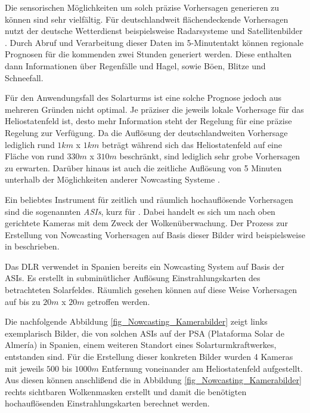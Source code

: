 Die sensorischen Möglichkeiten um solch präzise Vorhersagen generieren zu können sind sehr vielfältig.
Für deutschlandweit flächendeckende Vorhersagen nutzt der deutsche Wetterdienst beispielsweise Radarsysteme und Satellitenbilder \cite{DWD1}.
Durch Abruf und Verarbeitung dieser Daten im 5-Minutentakt können regionale Prognosen für die kommenden zwei Stunden generiert werden.
Diese enthalten dann Informationen über Regenfälle und Hagel, sowie Böen, Blitze und Schneefall.

Für den Anwendungsfall des Solarturms ist eine solche Prognose jedoch aus mehreren Gründen nicht optimal.
Je präziser die jeweils lokale Vorhersage für das Heliostatenfeld ist, desto mehr Information steht der Regelung für eine präzise Regelung zur Verfügung.
Da die Auflösung der deutschlandweiten Vorhersage lediglich rund $1km$ x $1km$ beträgt \cite{DWD1}\cite{DWD2} während sich das Heliostatenfeld auf eine Fläche von rund $330m$ x $310m$ beschränkt, sind lediglich sehr grobe Vorhersagen zu erwarten.
Darüber hinaus ist auch die zeitliche Auflösung von 5 Minuten \cite{DWD2} unterhalb der Möglichkeiten anderer Nowcasting Systeme \cite{DLRNowcasting}\cite[S. 272]{QuesadaRuiz}.

Ein beliebtes Instrument für zeitlich und räumlich hochauflösende Vorhersagen sind die sogenannten \textit{ASIs}, kurz für .
Dabei handelt es sich um nach oben gerichtete Kameras mit dem Zweck der Wolkenüberwachung.
Der Prozess zur Erstellung von Nowcasting Vorhersagen auf Basis dieser Bilder wird beispielsweise in \cite{QuesadaRuiz} beschrieben. \cite{Samu}

Das DLR verwendet in Spanien bereits ein Nowcasting System auf Basis der ASIs.
Es erstellt in subminütlicher Auflösung Einstrahlungskarten des betrachteten Solarfeldes.
Räumlich gesehen können auf diese Weise Vorhersagen auf bis zu $20m$ x $20m$ getroffen werden. \cite[S. 13]{Samu}\cite{DLRNowcasting}

Die nachfolgende Abbildung \ref{fig_Nowcasting_Kamerabilder} zeigt links exemplarisch Bilder, die von solchen ASIs auf der PSA (Plataforma Solar de Almería) in Spanien, einem weiteren Standort eines Solarturmkraftwerkes, entstanden sind.
Für die Erstellung dieser konkreten Bilder wurden 4 Kameras mit jeweils $500$ bis $1000m$ Entfernung voneinander am Heliostatenfeld aufgestellt.
Aus diesen können anschlißend die in Abbildung \ref{fig_Nowcasting_Kamerabilder} rechts sichtbaren Wolkenmasken erstellt und damit die benötigten hochauflösenden Einstrahlungskarten berechnet werden. \cite{DLRNowcasting}

